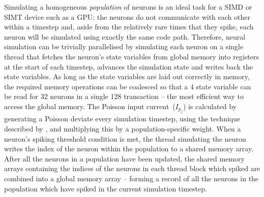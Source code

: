 \documentclass[utf8]{frontiersSCNS} %
\begin{document}
Simulating a homogeneous \textit{population} of neurons is an ideal
task for a SIMD or SIMT device such as a GPU: the neurons do not
communicate with each other within a timestep and, aside from the relatively rare times that they spike, each neuron will be simulated using exactly the same code path.
Therefore, neural simulation can be trivially parallelised by simulating each neuron on a single thread that fetches the neuron's state variables from global memory into registers at the start of each timestep, advances the simulation state and writes back the state variables.
As long as the state variables are laid out correctly in memory, the required memory operations can be coalesced so that a \SI{4}{\byte} state variable can be read for \num{32} neurons in a single \SI{128}{\byte} transaction -- the most efficient way to access the global memory.
The Poisson input current~($I_{p_{j}}$) is calculated by generating a Poisson deviate every simulation timestep, using the technique described by \citet[p504]{DevroyeLuc2013}, and multiplying this by a population-specific weight.
When a neuron's spiking threshold condition is met, the thread simulating the neuron writes the index of the neuron within the population to a shared memory array.
After all the neurons in a population have been updated, the shared memory arrays containing the indices of the neurons in each thread block which spiked are combined into a global memory array -- forming a record of all the neurons in the population which have spiked in the current simulation timestep.
\end{document}
